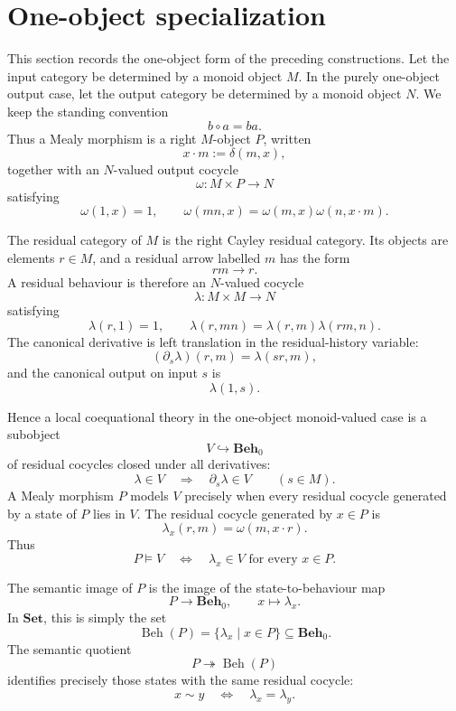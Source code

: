\section{One-object specialization}
\label{sec:coeq-one-object-specialization}

This section records the one-object form of the preceding constructions. Let
the input category be determined by a monoid object \(M\). In the purely
one-object output case, let the output category be determined by a monoid
object \(N\). We keep the standing convention
\[
    b\circ a=ba .
\]
Thus a Mealy morphism is a right \(M\)-object \(P\), written
\[
    x\cdot m:=\delta(m,x),
\]
together with an \(N\)-valued output cocycle
\[
    \omega:M\times P\to N
\]
satisfying
\[
    \omega(1,x)=1,
    \qquad
    \omega(mn,x)=\omega(m,x)\omega(n,x\cdot m).
\]

The residual category of \(M\) is the right Cayley residual category. Its
objects are elements \(r\in M\), and a residual arrow labelled \(m\) has the
form
\[
    rm\longrightarrow r .
\]
A residual behaviour is therefore an \(N\)-valued cocycle
\[
    \lambda:M\times M\to N
\]
satisfying
\[
    \lambda(r,1)=1,
    \qquad
    \lambda(r,mn)=\lambda(r,m)\lambda(rm,n).
\]
The canonical derivative is left translation in the residual-history variable:
\[
    (\partial_s\lambda)(r,m)=\lambda(sr,m),
\]
and the canonical output on input \(s\) is
\[
    \lambda(1,s).
\]

Hence a local coequational theory in the one-object monoid-valued case is a
subobject
\[
    V\hookrightarrow \mathbf{Beh}_0
\]
of residual cocycles closed under all derivatives:
\[
    \lambda\in V
    \quad\Longrightarrow\quad
    \partial_s\lambda\in V
    \qquad(s\in M).
\]
A Mealy morphism \(P\) models \(V\) precisely when every residual cocycle
generated by a state of \(P\) lies in \(V\). The residual cocycle generated by
\(x\in P\) is
\[
    \lambda_x(r,m)=\omega(m,x\cdot r).
\]
Thus
\[
    P\models V
    \quad\Longleftrightarrow\quad
    \lambda_x\in V
    \text{ for every }x\in P .
\]

The semantic image of \(P\) is the image of the state-to-behaviour map
\[
    P\to \mathbf{Beh}_0,
    \qquad
    x\longmapsto \lambda_x .
\]
In \(\mathbf{Set}\), this is simply the set
\[
    \operatorname{Beh}(P)
    =
    \{\lambda_x\mid x\in P\}
    \subseteq \mathbf{Beh}_0 .
\]
The semantic quotient
\[
    P\twoheadrightarrow \operatorname{Beh}(P)
\]
identifies precisely those states with the same residual cocycle:
\[
    x\sim y
    \quad\Longleftrightarrow\quad
    \lambda_x=\lambda_y .
\]

